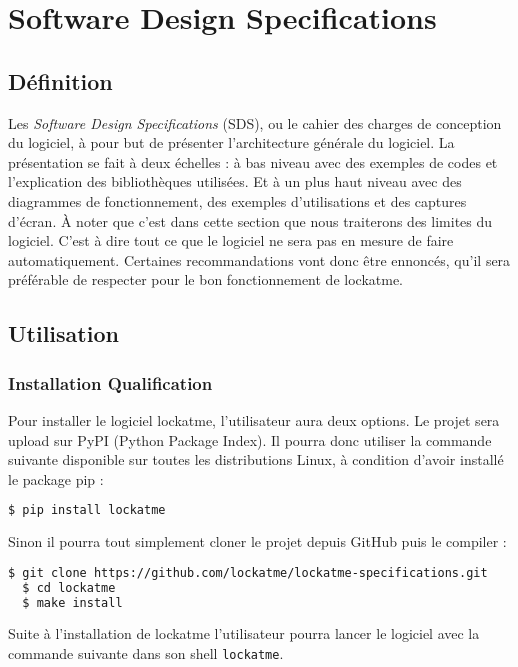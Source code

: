 \chapter{Software Design Specifications}
\newpage

\section{Définition}
Les \emph{Software Design Specifications} (SDS), ou le cahier des charges de conception
du logiciel, à pour but de présenter l'architecture générale du logiciel.
La présentation se fait à deux échelles : à bas niveau avec des exemples de codes et
l'explication des bibliothèques utilisées. Et à un plus haut niveau avec des diagrammes
de fonctionnement, des exemples d'utilisations et des captures d'écran. À noter
que c'est dans cette section que nous traiterons des limites du logiciel. C'est
à dire tout ce que le logiciel ne sera pas en mesure de faire automatiquement.
Certaines recommandations vont donc être ennoncés, qu'il sera préférable de
respecter pour le bon fonctionnement de lockatme.
\section{Utilisation}
  \subsection{Installation Qualification}
Pour installer le logiciel lockatme, l'utilisateur aura deux options. Le
projet sera upload sur PyPI (Python Package Index). Il pourra donc utiliser la commande
suivante disponible sur toutes les distributions Linux, à condition d'avoir
installé le package pip :
\begin{lstlisting}[language=bash]
  $ pip install lockatme
\end{lstlisting}
Sinon il pourra tout simplement cloner le projet depuis GitHub puis le compiler :
\begin{lstlisting}[language=bash]
  $ git clone https://github.com/lockatme/lockatme-specifications.git
  $ cd lockatme
  $ make install
\end{lstlisting}
Suite à l'installation de lockatme l'utilisateur pourra lancer le logiciel
avec la commande suivante dans son shell \verb|lockatme|.

